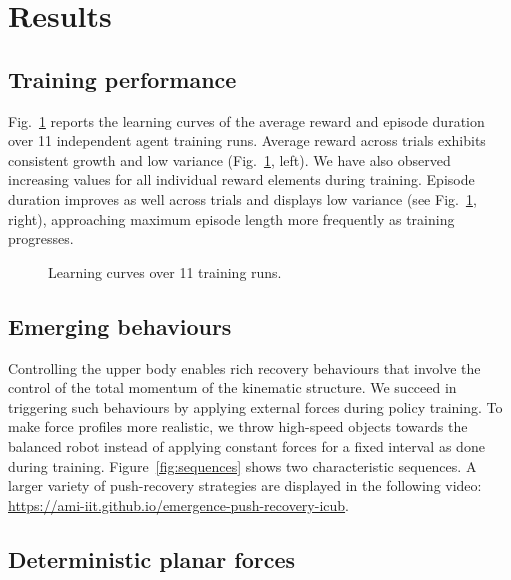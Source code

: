 \section{Results}

\subsection{Training performance}

Fig.~\ref{fig:learning_curves} reports the learning curves of the average reward and episode duration over 11 independent agent training runs.
Average reward across trials exhibits consistent growth and low variance (Fig.~\ref{fig:learning_curves}, left).
We have also observed increasing values for all individual reward elements during training.
Episode duration improves as well across trials and displays low variance (see Fig.~\ref{fig:learning_curves}, right), approaching maximum episode length more frequently as training progresses.

\begin{figure}
    \centering
    \caption{Learning curves over 11 training runs.}
    \label{fig:learning_curves}
\end{figure}

\subsection{Emerging behaviours}

Controlling the upper body enables rich recovery behaviours that involve the control of the total momentum of the kinematic structure.
We succeed in triggering such behaviours by applying external forces during policy training.
To make force profiles more realistic, we throw high-speed objects towards the balanced robot instead of applying constant forces for a fixed interval as done during training.
Figure~\ref{fig:sequences} shows two characteristic sequences.
A larger variety of push-recovery strategies are displayed in the following video: \url{https://ami-iit.github.io/emergence-push-recovery-icub}.

\subsection{Deterministic planar forces}

